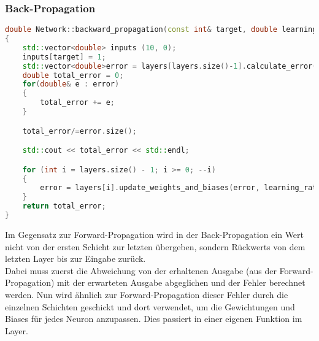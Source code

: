 \subsubsection{Back-Propagation}
\label{sec:RealBackPropagationCode}
\begin{lstlisting}[language=c++]
double Network::backward_propagation(const int& target, double learning_rate) 
{
	std::vector<double> inputs (10, 0);
	inputs[target] = 1;
	std::vector<double>error = layers[layers.size()-1].calculate_error(inputs);
	double total_error = 0;
	for(double& e : error) 
	{
		total_error += e;
	}

	total_error/=error.size();

	std::cout << total_error << std::endl;

	for (int i = layers.size() - 1; i >= 0; --i) 
	{
		error = layers[i].update_weights_and_biases(error, learning_rate);
	}
	return total_error;
}
\end{lstlisting}
Im Gegensatz zur Forward-Propagation wird in der Back-Propagation ein Wert nicht von der ersten Schicht zur letzten übergeben, sondern Rückwerts von dem letzten Layer bis zur Eingabe zurück.
\\ 
Dabei muss zuerst die Abweichung von der erhaltenen Ausgabe (aus der Forward-Propagation) mit der erwarteten Ausgabe abgeglichen und der Fehler berechnet werden. Nun wird ähnlich zur Forward-Propagation dieser Fehler durch die einzelnen Schichten geschickt und dort verwendet, um die Gewichtungen und Biases für jedes Neuron anzupassen. Dies passiert in einer eigenen Funktion im Layer.

